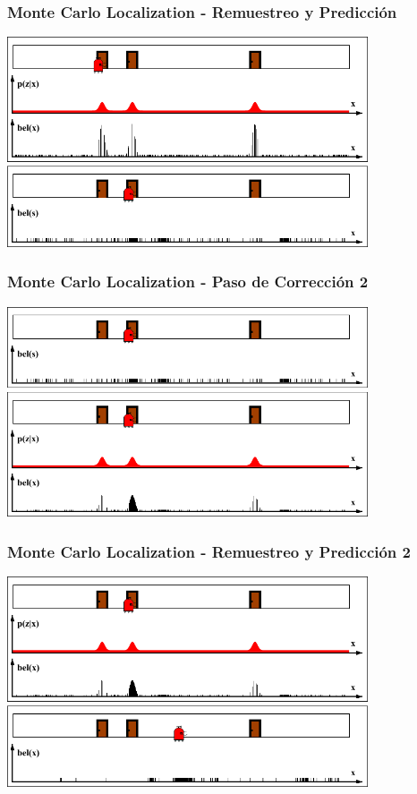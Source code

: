 \begin{frame}
    \frametitle{Monte Carlo Localization - Remuestreo y Predicción}

    \begin{center}
        \includegraphics[width=0.8\textwidth]{./images/particle_filter/monte_carlo_resample_and_predict.pdf}
    \end{center}

\end{frame}

\begin{frame}
    \frametitle{Monte Carlo Localization - Paso de Corrección 2}

    \begin{center}
        \includegraphics[width=0.8\textwidth]{./images/particle_filter/monte_carlo_correction2.pdf}
    \end{center}

\end{frame}

\begin{frame}
    \frametitle{Monte Carlo Localization - Remuestreo y Predicción 2}

    \begin{center}
        \includegraphics[width=0.8\textwidth]{./images/particle_filter/monte_carlo_resample_and_predict2.pdf}
    \end{center}

\end{frame}


